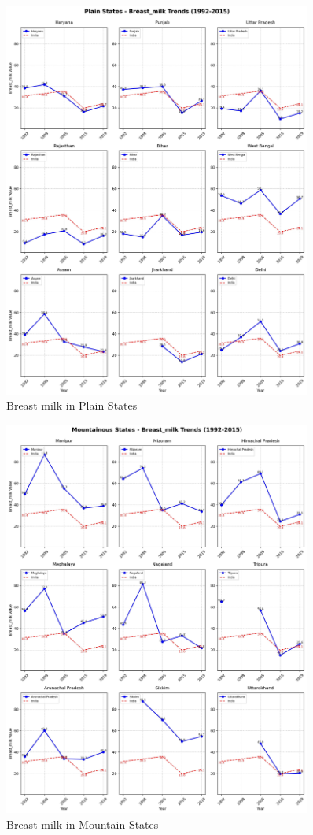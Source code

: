 \begin{figure}[H]
    \centering
    \includegraphics[width=0.9\textwidth]{figures/nfhs/plain_states_breast_milk_subplots.pdf}
    \caption{Breast milk in Plain States}
    \label{fig:nfhs_plain_breast_milk}
\end{figure}

\begin{figure}[H]
    \centering
    \includegraphics[width=0.9\textwidth]{figures/nfhs/mountainous_states_breast_milk_subplots.pdf}
    \caption{Breast milk in Mountain States}
    \label{fig:nfhs_mountain_breast_milk}
\end{figure}